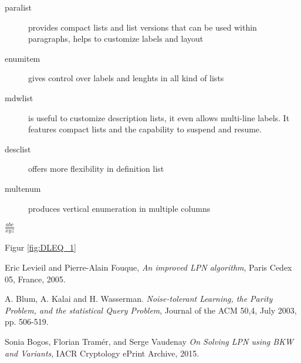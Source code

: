 \documentclass{article}
\begin{document}
\begin{description}
  \item[paralist] provides compact lists and list versions
    that can be used within paragraphs, helps to customize
    labels and layout
  \item[enumitem] gives control over labels and lenghts in all
    kind of lists
  \item[mdwlist] is useful to customize description lists,
    it even allows multi-line labels. It features compact lists
    and the capability to suspend and resume.
  \item[desclist] offers more flexibility in definition list
  \item[multenum] produces vertical enumeration in
    multiple columns
\end{description}


\begin{math}
\frac{abc}{xyz}
 \end{math}    
 

Figur \ref{fig:DLEQ_1}


 


\begin{thebibliography}{9}

  Eric Levieil and Pierre-Alain Fouque,
  \emph{An improved LPN algorithm},
  Paris Cedex 05, France, 2005.
  
  A. Blum, A. Kalai and H. Wasserman.
  \emph{Noise-tolerant Learning, the Parity Problem, and the statistical Query Problem},
  Journal of the ACM 50,4, July 2003, pp. 506-519.
  
  Sonia Bogos, Florian Tramér, and Serge Vaudenay
  \emph{On Solving LPN using BKW and Variants},
  {IACR} Cryptology ePrint Archive, 2015.  
  

\end{thebibliography}
 
\end{document}
